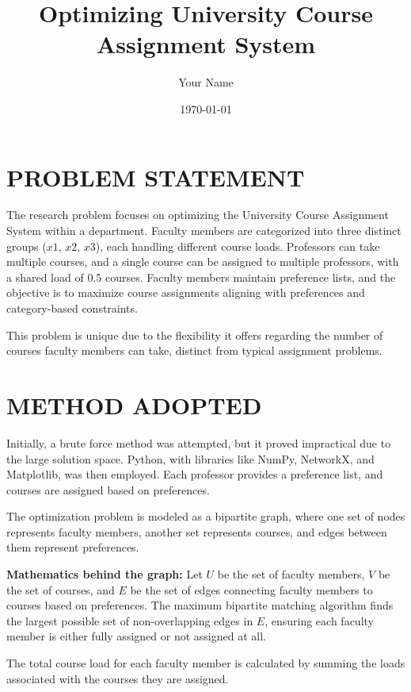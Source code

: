 \documentclass[twoside]{article}
\begin{document}
\title{Optimizing University Course Assignment System}
\author{Your Name}
\date{\today}
\maketitle

\section*{PROBLEM STATEMENT}

The research problem focuses on optimizing the University Course Assignment System within a department. Faculty members are categorized into three distinct groups (\(x1\), \(x2\), \(x3\)), each handling different course loads. Professors can take multiple courses, and a single course can be assigned to multiple professors, with a shared load of 0.5 courses. Faculty members maintain preference lists, and the objective is to maximize course assignments aligning with preferences and category-based constraints.

This problem is unique due to the flexibility it offers regarding the number of courses faculty members can take, distinct from typical assignment problems.

\section*{METHOD ADOPTED}

Initially, a brute force method was attempted, but it proved impractical due to the large solution space. Python, with libraries like NumPy, NetworkX, and Matplotlib, was then employed. Each professor provides a preference list, and courses are assigned based on preferences.

The optimization problem is modeled as a bipartite graph, where one set of nodes represents faculty members, another set represents courses, and edges between them represent preferences.

\textbf{Mathematics behind the graph:} Let \(U\) be the set of faculty members, \(V\) be the set of courses, and \(E\) be the set of edges connecting faculty members to courses based on preferences. The maximum bipartite matching algorithm finds the largest possible set of non-overlapping edges in \(E\), ensuring each faculty member is either fully assigned or not assigned at all.

The total course load for each faculty member is calculated by summing the loads associated with the courses they are assigned.
\end{document}
